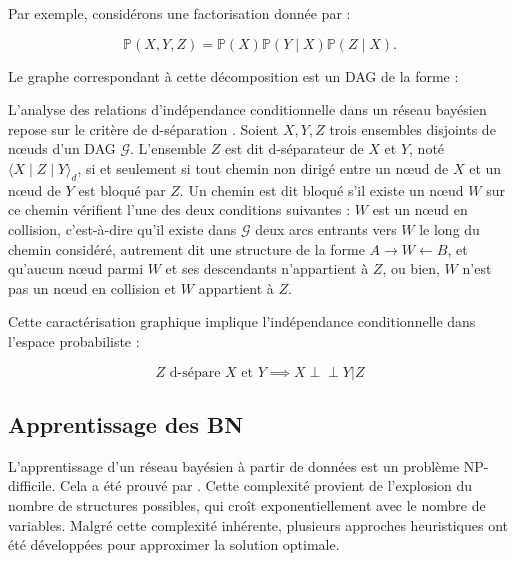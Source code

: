 \documentclass{article}
\newcommand\independent{\perp\!\!\!\!\!\!\perp}
\begin{document}
Par exemple, considérons une factorisation donnée par :

$$
    \mathbb{P}(X, Y, Z) = \mathbb{P}(X) \mathbb{P}(Y \mid X) \mathbb{P}(Z \mid X).
$$

Le graphe correspondant à cette décomposition est un DAG de la forme :

\begin{center}
\end{center}


L'analyse des relations d'indépendance conditionnelle dans un réseau bayésien repose sur le critère de
d-séparation \cite{10.5555/534975}. Soient $X, Y, Z$ trois ensembles disjoints de nœuds d'un DAG $\mathcal{G}$.
L'ensemble $Z$ est dit d-séparateur de $X$ et $Y$, noté $\langle X \mid Z \mid Y \rangle_d$, si et seulement si
tout chemin non dirigé entre un nœud de $X$ et un nœud de $Y$ est bloqué par $Z$. Un chemin est dit bloqué s'il
existe un nœud $W$ sur ce chemin vérifient l'une des deux conditions suivantes : $W$ est un nœud en collision,
c'est-à-dire qu'il existe dans $\mathcal{G}$ deux arcs entrants vers $W$ le long du chemin considéré,
autrement dit une structure de la forme $A \to W \gets B$, et qu'aucun nœud parmi $W$ et ses descendants n'appartient
à $Z$, ou bien, $W$ n'est pas un nœud en collision et $W$ appartient à $Z$.

Cette caractérisation graphique implique l'indépendance conditionnelle dans l'espace probabiliste :

$$
    Z \text{ d-sépare } X \text{ et } Y \implies X \independent Y | Z
$$

\subsection{Apprentissage des BN}

L'apprentissage d'un réseau bayésien à partir de données est un problème NP-difficile. Cela a été prouvé par
\citet{chickering1996learning}. Cette complexité provient de l'explosion du nombre de structures possibles,
qui croît exponentiellement avec le nombre de variables. Malgré cette complexité inhérente, plusieurs approches
heuristiques ont été développées pour approximer la solution optimale.
\end{document}
